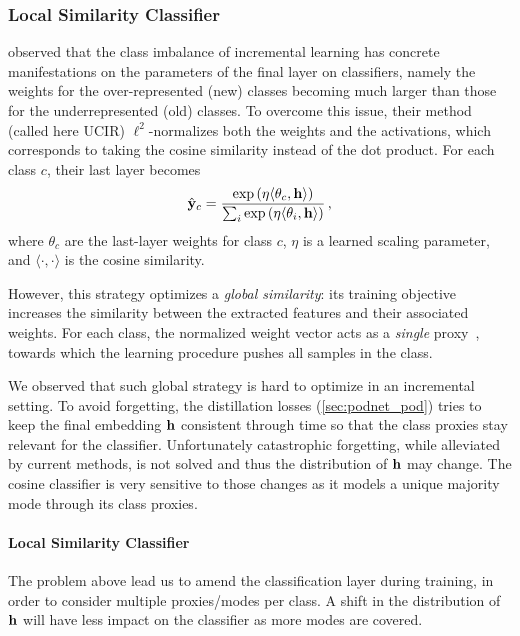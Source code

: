 \subsubsection{Local Similarity Classifier}
\label{sec:podnet_local_classifier}

\citet{hou2019ucir} observed that the class imbalance of incremental learning has concrete
manifestations on the parameters of the final layer on classifiers, namely the weights for the
over-represented (new) classes becoming much larger than those for the underrepresented (old)
classes. To overcome this issue, their method (called here UCIR) $\ell^2$-normalizes both the
weights and the activations, which corresponds to taking the cosine similarity instead of the dot
product. For each class $c$, their last layer becomes
%
\begin{equation}
    \hat{\mathbf{y}}_{c}=\frac{\exp\left(\eta\langle\theta_{c},\mathbf{h}\rangle\right)}{\sum_{i} \exp \left(\eta\langle\theta_{i}, \mathbf{h}\rangle\right)}\,,
\end{equation}
%
\noindent where $\theta_c$ are the last-layer weights for class $c$, $\eta$ is a learned scaling
parameter, and $\langle\cdot,\cdot\rangle$ is the cosine similarity.

However, this strategy optimizes a \textit{global similarity}: its training objective increases the
similarity between the extracted features and their associated weights. For each class, the
normalized weight vector acts as a \textit{single} proxy~\citep{attias2017proxynca}, towards which
the learning procedure pushes all samples in the class.

We observed that such global strategy is hard to optimize in an incremental setting. To avoid
forgetting, the distillation losses (\autoref{sec:podnet_pod}) tries to keep the final embedding
$\mathbf{h}$ consistent through time so that the class proxies stay relevant for the classifier.
Unfortunately catastrophic forgetting, while alleviated by current methods, is not solved and thus
the distribution of $\mathbf{h}$ may change. The cosine classifier is very sensitive to those changes as it
models a unique majority mode through its class proxies.


\paragraph{Local Similarity Classifier} The problem above lead us to amend the classification layer
during training, in order to consider multiple proxies/modes per class. A shift in the distribution
of $\mathbf{h}$ will have less impact on the classifier as more modes are covered.



